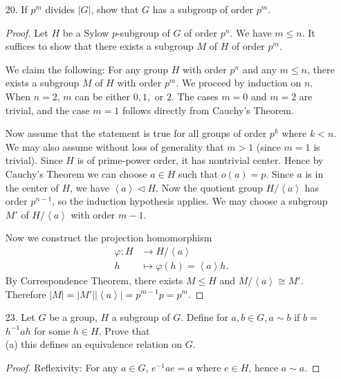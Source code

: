 \begin{itemize}
\begin{proof}
	Then by the Sylow Theorem, $P$ and $a^{-1} Pa$ are conjugate in $N(P)$. Hence there exists some $b \in N(P)$ such that $b^{-1} P b = a^{-1} P a$. Thus $ab^{-1} \in N(P)$. Therefore $a \in N(P)$ and we are done showing $N(N(P)) \subset N(P)$.
\end{proof}

	\item [20.] If $p^m$ divides $|G|$, show that $G$ has a subgroup of order $p^m$.
\begin{proof}
	Let $H$ be a Sylow $p$-subgroup of $G$ of order $p^n$. We have $m \le  n$. It suffices to show that there exists a subgroup $M$ of $H$ of order $p^m$. 

	We claim the following: For any group $H$ with order $p^n$ and any $m \le n$, there exists a subgroup $M$ of $H$ with order $p^m$. We proceed by induction on $n$. When $n=2$, $m$ can be either $0, 1, $ or $2$. The cases $m=0$ and $m=2$ are trivial, and the case  $m=1$ follows directly from Cauchy's Theorem.

	Now assume that the statement is true for all groups of order $p^k$ where $k < n$. We may also assume without loss of generality that $m > 1$ (since $m=1$ is trivial). Since $H$ is of prime-power order, it has nontrivial center. Hence by Cauchy's Theorem we can choose $a \in H$ such that $o(a) = p$. Since $a$ is in the center of $H$, we have $\left\langle a \right\rangle \triangleleft H$. Now the quotient group $H / \left\langle a \right\rangle $ has order $p^{n-1}$, so the induction hypothesis applies. We may choose a subgroup $M'$ of $H / \left\langle a \right\rangle $ with order $m-1$.

	Now we construct the projection homomorphism
	\begin{align*}
		\varphi: H &\longrightarrow H / \left\langle a \right\rangle \\
		h &\longmapsto \varphi(h) = \left\langle a \right\rangle h
	.\end{align*}
	By Correspondence Theorem, there exists $M \le H$ and $M / \left\langle a \right\rangle  \cong M'$. Therefore $|M| = |M'| |\left\langle a \right\rangle | = p^{m-1 }p = p^m$.
\end{proof}

	\item [23.] Let $G$ be a group, $H$ a subgroup of $G$. Define for $a, b \in G, a \sim b$ if $b=$ $h^{-1} a h$ for some $h \in H$. Prove that\\
(a) this defines an equivalence relation on $G$.
\begin{proof}
	Reflexivity: For any $a \in G$, $e^{-1} a e = a$ where $e \in H$, hence $a \sim a$.


\end{proof}
\end{itemize}
